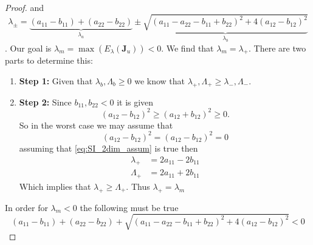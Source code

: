 \documentclass{article}
\begin{document}
\begin{proof}
                and 
                \begin{equation}
                    \lambda_{\pm}=\underset{\lambda_a}{\underbrace{(a_{11}-b_{11})+(a_{22}-b_{22})}}\pm \underset{\lambda_b}{\underbrace{\sqrt{(a_{11}-a_{22}-b_{11}+b_{22})^2+4(a_{12}-b_{12})^2}}}
                \end{equation}.
                  Our goal is $\lambda_m=\max(E_\lambda(\mathbf{J}_u))<0$. We find that $\lambda_m=\lambda_+$.
                 There are two parts to determine this:
                 \begin{enumerate}
                     \item[] \textbf{Step 1:}
                     Given that $\lambda_b,\Lambda_b\geq 0$ we know that $\lambda_{+},\Lambda_+\geq \lambda_{-},\Lambda_{-}$.
                     \item[] \textbf{Step 2:}
                      Since $b_{11},b_{22}<0$ it is given 
                      \begin{equation}
                          (a_{12}-b_{12})^2\geq (a_{12}+b_{12})^2\geq 0.
                      \end{equation}
                      So in the worst case we may assume that 
                      \begin{equation}
                          (a_{12}-b_{12})^2=(a_{12}-b_{12})^2=0 \label{eq:SI_2dim_assum}
                      \end{equation}
                      assuming that \cref{eq:SI_2dim_assum} is true then 
                      \begin{align}
                          \lambda_{+}&=2a_{11}-2b_{11}\\
                          \Lambda_{+}&=2a_{11}+2b_{11}
                      \end{align}
                      Which implies that $\lambda_{+}\geq \Lambda_{+}$. Thus $\lambda_{+}=\lambda_{m}$
                 \end{enumerate}  
                In order for $\lambda_m<0$ the following must be true 
                \begin{equation}
                    (a_{11}-b_{11})+(a_{22}-b_{22})+ \sqrt{(a_{11}-a_{22}-b_{11}+b_{22})^2+4(a_{12}-b_{12})^2}<0
                \end{equation}
            \end{proof}
                
\end{document}
